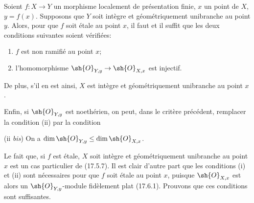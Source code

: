 \begin{theorem}[18.10.1]
\label{IV.18.10.1}
Soient $f:X\to Y$ un morphisme localement de présentation finie, $x$ un point de $X$, $y=f(x)$. Supposons que $Y$ soit intègre et géométriquement unibranche au point $y$. Alors, pour que $f$ soit étale au point $x$, il faut et il suffit que les deux conditions suivantes soient vérifiées:
\begin{enumerate}
  \item[\textup{(i)}] $f$ est non ramifié au point $x$;
  \item[\textup{(ii)}] l'homomorphisme $\sh{O}_{Y,y}\to\sh{O}_{X,x}$ est injectif.
\end{enumerate}

De plus, s'il en est ainsi, $X$ est intègre et géométriquement unibranche au point $x$.

Enfin, si $\sh{O}_{Y,y}$ est noethérien, on peut, dans le critère précédent, remplacer la condition \textup{(ii)} par la condition

\textup{(ii \emph{bis})} On a $\dim\sh{O}_{Y,y}\leq\dim\sh{O}_{X,x}$.
\end{theorem}

Le fait que, si $f$ est étale, $X$ soit intègre et géométriquement unibranche au point $x$ est un cas particulier de (17.5.7). Il est clair d'autre part que les conditions (i) et (ii) sont nécessaires pour que $f$ soit étale au point $x$, puisque $\sh{O}_{X,x}$ est alors un $\sh{O}_{Y,y}$-module fidèlement plat (17.6.1). Prouvons que ces conditions sont suffisantes.

